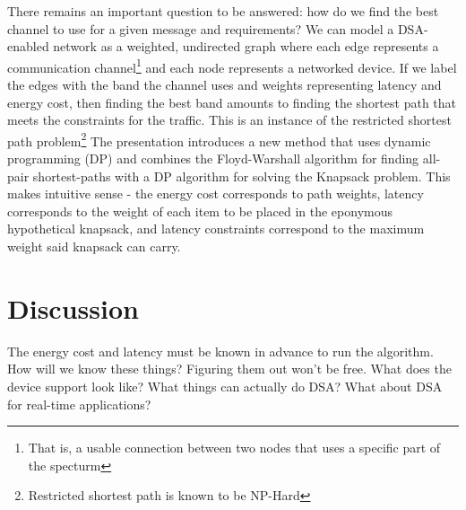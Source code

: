 \documentclass[]{article}
\begin{document}
There remains an important question to be answered: how do we find the best channel to use for a given message and requirements? We can model a DSA-enabled network as a weighted, undirected graph where each edge represents a communication channel\footnote{That is, a usable connection between two nodes that uses a specific part of the specturm} and each node represents a networked device. If we label the edges with the band the channel uses and weights representing latency and energy cost, then finding the best band amounts to finding the shortest path that meets the constraints for the traffic. This is an instance of the restricted shortest path problem\footnote{Restricted shortest path is known to be NP-Hard} The presentation introduces a new method that uses dynamic programming (DP) and combines the Floyd-Warshall algorithm for finding all-pair shortest-paths with a DP algorithm for solving the Knapsack problem. This makes intuitive sense - the energy cost corresponds to path weights, latency corresponds to the weight of each item to be placed in the eponymous hypothetical knapsack, and latency constraints correspond to the maximum weight said knapsack can carry.
\section{Discussion}
The energy cost and latency must be known in advance to run the algorithm. How will we know these things? Figuring them out won't be free.
What does the device support look like? What things can actually do DSA?
What about DSA for real-time applications?


\end{document}
